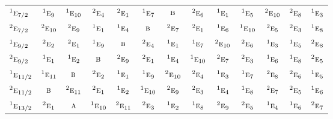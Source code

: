 \documentclass[10pt,a4paper]{article}
\numberwithin{equation}{section}
\newcommand{\irr}[1]{\text{\normalfont\scshape #1}}
\newcommand{\conjpair}[1]{{}^{#1}}
\begin{document}
{\begin{longtable}{@{}lcccccccccccc@{}}
$\conjpair{1}\irr{e}_{7/2}$ & $\conjpair{1}\irr{e}_{9}$ & $\conjpair{1}\irr{e}_{10}$ & $\conjpair{2}\irr{e}_{4}$ & $\conjpair{2}\irr{e}_{1}$ & $\conjpair{1}\irr{e}_{7}$ & $\irr{b}$ & $\conjpair{2}\irr{e}_{6}$ & $\conjpair{1}\irr{e}_{1}$ & $\conjpair{1}\irr{e}_{5}$ & $\conjpair{2}\irr{e}_{10}$ & $\conjpair{2}\irr{e}_{8}$ & $\conjpair{1}\irr{e}_{3}$\\
$\conjpair{2}\irr{e}_{7/2}$ & $\conjpair{2}\irr{e}_{10}$ & $\conjpair{2}\irr{e}_{9}$ & $\conjpair{1}\irr{e}_{1}$ & $\conjpair{1}\irr{e}_{4}$ & $\irr{b}$ & $\conjpair{2}\irr{e}_{7}$ & $\conjpair{2}\irr{e}_{1}$ & $\conjpair{1}\irr{e}_{6}$ & $\conjpair{1}\irr{e}_{10}$ & $\conjpair{2}\irr{e}_{5}$ & $\conjpair{2}\irr{e}_{3}$ & $\conjpair{1}\irr{e}_{8}$\\
$\conjpair{1}\irr{e}_{9/2}$ & $\conjpair{2}\irr{e}_{2}$ & $\conjpair{2}\irr{e}_{1}$ & $\conjpair{1}\irr{e}_{9}$ & $\irr{b}$ & $\conjpair{2}\irr{e}_{4}$ & $\conjpair{1}\irr{e}_{1}$ & $\conjpair{1}\irr{e}_{7}$ & $\conjpair{2}\irr{e}_{10}$ & $\conjpair{2}\irr{e}_{6}$ & $\conjpair{1}\irr{e}_{3}$ & $\conjpair{1}\irr{e}_{5}$ & $\conjpair{2}\irr{e}_{8}$\\
$\conjpair{2}\irr{e}_{9/2}$ & $\conjpair{1}\irr{e}_{1}$ & $\conjpair{1}\irr{e}_{2}$ & $\irr{b}$ & $\conjpair{2}\irr{e}_{9}$ & $\conjpair{2}\irr{e}_{1}$ & $\conjpair{1}\irr{e}_{4}$ & $\conjpair{1}\irr{e}_{10}$ & $\conjpair{2}\irr{e}_{7}$ & $\conjpair{2}\irr{e}_{3}$ & $\conjpair{1}\irr{e}_{6}$ & $\conjpair{1}\irr{e}_{8}$ & $\conjpair{2}\irr{e}_{5}$\\
$\conjpair{1}\irr{e}_{11/2}$ & $\conjpair{1}\irr{e}_{11}$ & $\irr{b}$ & $\conjpair{2}\irr{e}_{2}$ & $\conjpair{1}\irr{e}_{1}$ & $\conjpair{1}\irr{e}_{9}$ & $\conjpair{2}\irr{e}_{10}$ & $\conjpair{2}\irr{e}_{4}$ & $\conjpair{1}\irr{e}_{3}$ & $\conjpair{1}\irr{e}_{7}$ & $\conjpair{2}\irr{e}_{8}$ & $\conjpair{2}\irr{e}_{6}$ & $\conjpair{1}\irr{e}_{5}$\\
$\conjpair{2}\irr{e}_{11/2}$ & $\irr{b}$ & $\conjpair{2}\irr{e}_{11}$ & $\conjpair{2}\irr{e}_{1}$ & $\conjpair{1}\irr{e}_{2}$ & $\conjpair{1}\irr{e}_{10}$ & $\conjpair{2}\irr{e}_{9}$ & $\conjpair{2}\irr{e}_{3}$ & $\conjpair{1}\irr{e}_{4}$ & $\conjpair{1}\irr{e}_{8}$ & $\conjpair{2}\irr{e}_{7}$ & $\conjpair{2}\irr{e}_{5}$ & $\conjpair{1}\irr{e}_{6}$\\
$\conjpair{1}\irr{e}_{13/2}$ & $\conjpair{2}\irr{e}_{1}$ & $\irr{a}$ & $\conjpair{1}\irr{e}_{10}$ & $\conjpair{2}\irr{e}_{11}$ & $\conjpair{2}\irr{e}_{3}$ & $\conjpair{1}\irr{e}_{2}$ & $\conjpair{1}\irr{e}_{8}$ & $\conjpair{2}\irr{e}_{9}$ & $\conjpair{2}\irr{e}_{5}$ & $\conjpair{1}\irr{e}_{4}$ & $\conjpair{1}\irr{e}_{6}$ & $\conjpair{2}\irr{e}_{7}$\\

\end{longtable}}
\end{document}
